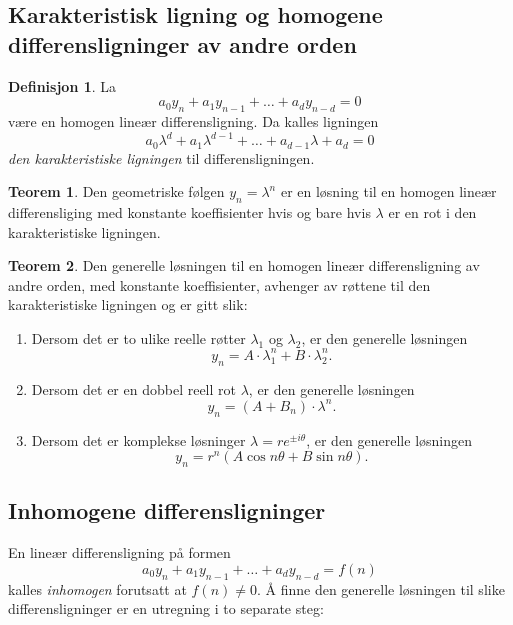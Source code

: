 \documentclass[11pt]{article}
\theoremstyle{definition}
\newtheorem{mindef}{Definisjon}[section]
\newenvironment{fmindef}
{\begin{mdframed}[style=minstil]\begin{mindef}}
		{\end{mindef}\end{mdframed}}
\theoremstyle{definition}
\theoremstyle{definition}
\theoremstyle{definition}
\newtheorem{teo}{Teorem}[section]
\newenvironment{fteo}
{\begin{mdframed}[style=minstil]\begin{teo}}
		{\end{teo}\end{mdframed}}
\theoremstyle{definition}
\theoremstyle{definition}
\begin{document}
		\subsection{Karakteristisk ligning og homogene differensligninger av andre orden}
		
		\begin{fmindef}
		La \[a_0y_n+a_1y_{n-1}+\ldots +a_dy_{n-d}=0 \]
		være en homogen lineær differensligning. Da kalles ligningen
		\[a_0\lambda^d+a_1\lambda^{d-1}+\ldots+a_{d-1}\lambda+a_d=0 \]
		\textit{den karakteristiske ligningen} til differensligningen.
		\end{fmindef}
		
		\begin{fteo}
		Den geometriske følgen \(y_n=\lambda^n \) er en løsning til en homogen lineær differensliging med konstante koeffisienter hvis og bare hvis \(\lambda \) er en rot i den karakteristiske ligningen.
		\end{fteo}
		
		\begin{fteo}
		Den generelle løsningen til en homogen lineær differensligning av andre orden, med konstante koeffisienter, avhenger av røttene til den karakteristiske ligningen og er gitt slik:
		
		\begin{enumerate}
			\item Dersom det er to ulike reelle røtter \(\lambda_1 \) og \(\lambda_2 \), er den generelle løsningen \[y_n=A\cdot \lambda_{1}^{n}+B\cdot\lambda_{2}^{n}. \]
			\item Dersom det er en dobbel reell rot \(\lambda \), er den generelle løsningen 
			\[y_n = (A+B_n)\cdot \lambda^n. \]
			\item Dersom det er komplekse løsninger \(\lambda = re^{\pm i\theta} \), er den generelle løsningen \[y_n=r^n(A\cos{n\theta}+B\sin{n\theta}). \]
		\end{enumerate}
		\end{fteo}
		
		\newpage
		
		\subsection{Inhomogene differensligninger}
		
		En lineær differensligning på formen \[a_0y_n+a_1y_{n-1}+\ldots + a_dy_{n-d}=f(n) \]
		kalles \textit{inhomogen} forutsatt at \(f(n)\neq 0. \) Å finne den generelle løsningen til slike differensligninger er en utregning i to separate steg:
		
\end{document}
